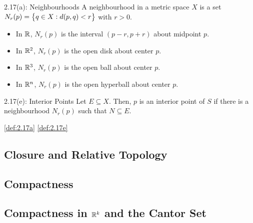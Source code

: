 \begin{ndef}{ 2.17(a): Neighbourhoods}{\label{def:2.17a}}
    A neighbourhood in a metric space $X$ is a set $N_r(p) = \set{q \in X: d(p, q) < r}$ with $r > 0$. 
\end{ndef}
\begin{nexample}{}
    \begin{itemize}
        \item In $\mathbb{R}$, $N_r(p)$ is the interval $(p - r, p + r)$ about midpoint $p$.
        \item In $\mathbb{R}^2$, $N_r(p)$ is the open disk about center $p$. 
        \item In $\mathbb{R}^3$, $N_r(p)$ is the open ball about center $p$.
        \item In $\mathbb{R}^n$, $N_r(p)$ is the open hyperball about center $p$. 
    \end{itemize}
\end{nexample}
\setcounter{rudin}{16}
\begin{ndef}{ 2.17(e): Interior Points}{\label{def:2.17e}}
    Let $E \subseteq X$. Then, $p$ is an interior point of $S$ if there is a neighbourhood $N_r(p)$ such that $N \subseteq E$. 
\end{ndef}
\ref{def:2.17a}
\ref{def:2.17e}

\subsection{Closure and Relative Topology}
\subsection{Compactness}
\subsection{Compactness in \texorpdfstring{$\mathbb{R}^k$}{TEXT} and the Cantor Set}
